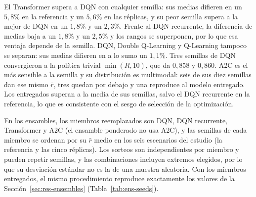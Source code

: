 \documentclass[../00_Main/Main.tex]{subfiles}
\begin{document}
El Transformer supera a DQN con cualquier semilla: sus medias difieren en
un $5{,}8\%$ en la referencia y un $5{,}6\%$ en las r\'eplicas, y su peor
semilla supera a la mejor de DQN en un $1{,}8\%$ y un $2{,}3\%$. Frente al
DQN recurrente, la diferencia de medias baja a un $1{,}8\%$ y un $2{,}5\%$
y los rangos se superponen, por lo que esa ventaja depende de la semilla.
DQN, Double Q-Learning y Q-Learning tampoco se separan: sus medias difieren
en a lo sumo un $1{,}1\%$. Tres semillas de DQN convergieron a la
pol\'itica trivial $\min(R, 10)$, que da $0{,}858$ y $0{,}860$. A2C es el
m\'as sensible a la semilla y su distribuci\'on es multimodal: seis de sus
diez semillas dan ese mismo $\bar r$, tres quedan por debajo y una
reproduce al modelo entregado. Los entregados superan a la media de sus
semillas, salvo el DQN recurrente en la referencia, lo que es consistente
con el sesgo de selecci\'on de la optimizaci\'on.

En los ensambles, los miembros reemplazados son DQN, DQN recurrente,
Transformer y A2C (el ensamble ponderado no usa A2C), y las semillas de
cada miembro se ordenan por su $\bar r$ medio en los seis escenarios del
estudio (la referencia y las cinco r\'eplicas). Los sorteos son
independientes por miembro y pueden repetir semillas, y las combinaciones
incluyen extremos elegidos, por lo que su desviaci\'on est\'andar no es la
de una muestra aleatoria. Con los miembros entregados, el mismo procedimiento reproduce
exactamente los valores de la Secci\'on~\ref{sec:res-ensembles}
(Tabla~\ref{tab:ens-seeds}).
\end{document}
